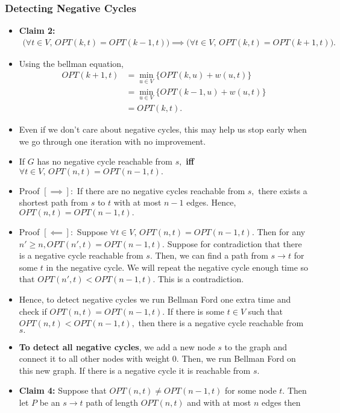 \documentclass[a4paper,12pt]{article}
\begin{document}
\subsubsection{Detecting Negative Cycles}
\begin{itemize}
    \item \textbf{Claim 2:}\begin{align}
        \Big(\forall t\in V,\,OPT(k,t)=OPT(k-1,t)\Big)\implies\Big(\forall t\in V,\,OPT(k,t)=OPT(k+1,t)\Big).
    \end{align}
    \item Using the bellman equation, \begin{align}
        OPT(k+1,t)&=\min_{u\in V}\{OPT(k,u)+w(u,t)\}\\
        &=\min_{u\in V}\{OPT(k-1,u)+w(u,t)\}\\
        &=OPT(k,t).
    \end{align}
    \item Even if we don't care about negative cycles, this may help us stop early when we go through one iteration with no improvement.
    \item If $G$ has no negative cycle reachable from $s,$ \textbf{iff} $\forall t\in V,\,OPT(n,t)=OPT(n-1,t).$
    \item Proof $[\implies]:$ If there are no negative cycles reachable from $s,$ there exists a shortest path from $s$ to $t$ with at most $n-1$ edges. Hence, $OPT(n,t)=OPT(n-1,t).$
    \item Proof $[\impliedby]:$ Suppose $\forall t\in V,\,OPT(n,t)=OPT(n-1,t).$ Then for any $n'\geq n,OPT(n',t)=OPT(n-1,t).$ Suppose for contradiction that there is a negative cycle reachable from $s.$ Then, we can find a path from $s\to t$ for some $t$ in the negative cycle. We will repeat the negative cycle enough time so that $OPT(n',t)<OPT(n-1,t).$ This is a contradiction.
    \item Hence, to detect negative cycles we run Bellman Ford one extra time and check if $OPT(n,t)=OPT(n-1,t).$ If there is some $t\in V$ such that $OPT(n,t)<OPT(n-1,t),$ then there is a negative cycle reachable from $s.$
    \item \textbf{To detect all negative cycles}, we add a new node $s$ to the graph and connect it to all other nodes with weight $0.$ Then, we run Bellman Ford on this new graph. If there is a negative cycle it is reachable from $s.$
    \item \textbf{Claim 4:} Suppose that $OPT(n,t)\neq OPT(n-1,t)$ for some node $t.$ Then let $P$ be an $s\to t$ path of length $OPT(n,t)$ and with at most $n$ edges then \begin{enumerate}

\end{enumerate}
\end{itemize}
\end{document}
